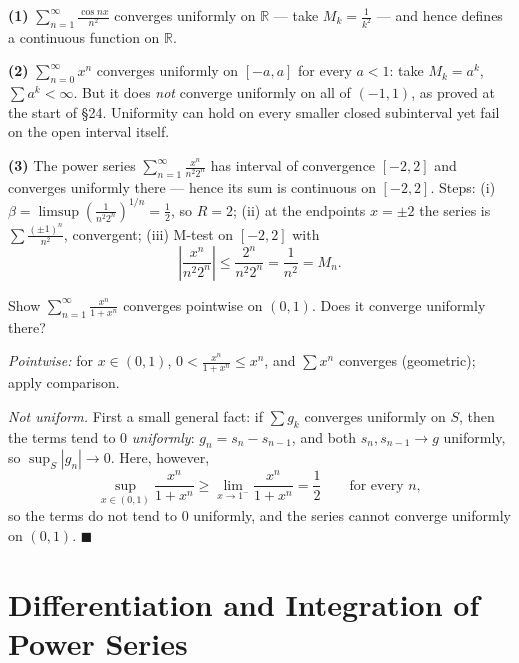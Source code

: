 \documentclass[11pt]{report}
\begin{document}
\begin{exbox}
\textbf{(1)} $\displaystyle\sum_{n=1}^\infty \frac{\cos nx}{n^2}$ converges uniformly on $\mathbb{R}$ --- take $M_k = \tfrac{1}{k^2}$ --- and hence defines a continuous function on $\mathbb{R}$.

\textbf{(2)} $\sum_{n=0}^\infty x^n$ converges uniformly on $[-a, a]$ for every $a < 1$: take $M_k = a^k$, $\sum a^k < \infty$. But it does \emph{not} converge uniformly on all of $(-1,1)$, as proved at the start of \S 24. Uniformity can hold on every smaller closed subinterval yet fail on the open interval itself.

\textbf{(3)} The power series $\displaystyle\sum_{n=1}^\infty \frac{x^n}{n^2 2^n}$ has interval of convergence $[-2,2]$ and converges uniformly there --- hence its sum is continuous on $[-2,2]$. Steps: (i) $\beta = \limsup \left(\tfrac{1}{n^2 2^n}\right)^{1/n} = \tfrac12$, so $R = 2$; (ii) at the endpoints $x = \pm2$ the series is $\sum \tfrac{(\pm1)^n}{n^2}$, convergent; (iii) M-test on $[-2,2]$ with
\[
\left| \frac{x^n}{n^2 2^n} \right| \leq \frac{2^n}{n^2 2^n} = \frac{1}{n^2} = M_n. \tag*{$\blacksquare$}
\]
\end{exbox}

\begin{exbox}
Show $\displaystyle\sum_{n=1}^\infty \frac{x^n}{1+x^n}$ converges pointwise on $(0,1)$. Does it converge uniformly there?

\emph{Pointwise:} for $x \in (0,1)$, $0 < \tfrac{x^n}{1+x^n} \leq x^n$, and $\sum x^n$ converges (geometric); apply comparison.

\emph{Not uniform.} First a small general fact: if $\sum g_k$ converges uniformly on $S$, then the terms tend to $0$ \emph{uniformly}: $g_n = s_n - s_{n-1}$, and both $s_n, s_{n-1} \to g$ uniformly, so $\sup_S |g_n| \to 0$. Here, however,
\[
\sup_{x \in (0,1)} \frac{x^n}{1+x^n} \geq \lim_{x \to 1^-} \frac{x^n}{1+x^n} = \frac12 \qquad \text{for every } n,
\]
so the terms do not tend to $0$ uniformly, and the series cannot converge uniformly on $(0,1)$. \hfill $\blacksquare$
\end{exbox}


\section{Differentiation and Integration of Power Series}
\end{document}

